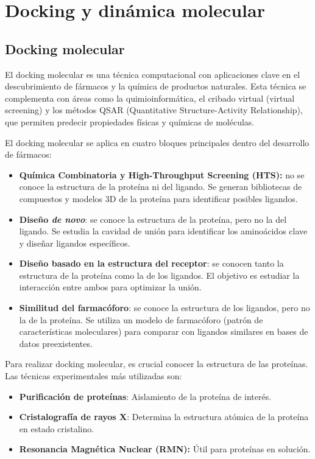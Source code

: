 \part{Docking y dinámica molecular}
\chapter{Docking molecular}
El docking molecular es una técnica computacional con aplicaciones clave en el descubrimiento de fármacos y la química de productos naturales. Esta técnica se complementa con áreas como la quimioinformática, el cribado virtual (virtual screening) y los métodos QSAR (Quantitative Structure-Activity Relationship), que permiten predecir propiedades físicas y químicas de moléculas.

El docking molecular se aplica en cuatro bloques principales dentro del desarrollo de fármacos:
\begin{itemize}
\item \textbf{Química Combinatoria y High-Throughput Screening (HTS):} no se conoce la estructura de la proteína ni del ligando. Se generan bibliotecas de compuestos y modelos 3D de la proteína para identificar posibles ligandos.

\item \textbf{Diseño \textit{de novo}}: se conoce la estructura de la proteína, pero no la del ligando. Se estudia la cavidad de unión para identificar los aminoácidos clave y diseñar ligandos específicos. 

\item \textbf{Diseño basado en la estructura del receptor}: se conocen tanto la estructura de la proteína como la de los ligandos. El objetivo es estudiar la interacción entre ambos para optimizar la unión.

\item \textbf{Similitud del farmacóforo}: se conoce la estructura de los ligandos, pero no la de la proteína. Se utiliza un modelo de farmacóforo (patrón de características moleculares) para comparar con ligandos similares en bases de datos preexistentes.
\end{itemize}

Para realizar docking molecular, es crucial conocer la estructura de las proteínas. Las técnicas experimentales más utilizadas son:
\begin{itemize}
\item \textbf{Purificación de proteínas}: Aislamiento de la proteína de interés.
\item \textbf{Cristalografía de rayos X}: Determina la estructura atómica de la proteína en estado cristalino.
\item \textbf{Resonancia Magnética Nuclear (RMN):} Útil para proteínas en solución.
\end{itemize}

